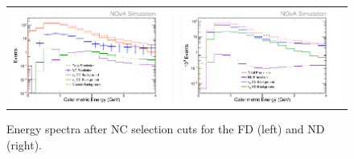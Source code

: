 \begin{figure}[htb]
  \centering
  \begin{tabular}{c c}
    \includegraphics[width=.47\textwidth]{figures/SelE/RecoE4FD.png} &
    \includegraphics[width=.47\linewidth]{figures/SelE/RecoE4ND.png} \\
  \end{tabular}
  \caption[Energy Spectra After NC Selection Cuts]{Energy spectra after NC selection cuts for the FD (left) and ND (right).}
  \label{fig:NP1NCSel}
\end{figure}

